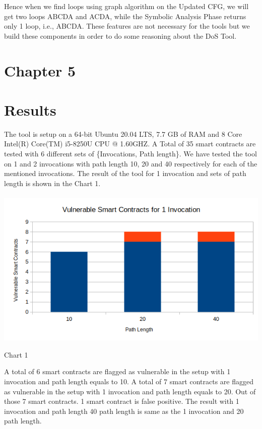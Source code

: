 \documentclass{article}
\begin{document}
Hence when we find loops using graph algorithm on the Updated CFG, we will get two loops ABCDA and ACDA, while the Symbolic Analysis Phase returns only 1 loop, i.e., ABCDA. These features are not necessary for the tools but we build these components in order to do some reasoning about the DoS Tool.

\newpage
\section*{Chapter 5}
\section*{Results}
The tool is setup on a 64-bit Ubuntu 20.04 LTS, 7.7 GB of RAM and 8 Core Intel(R) Core(TM) i5-8250U CPU @ 1.60GHZ. A Total of 35 smart contracts are tested with 6 different sets of \{Invocations, Path length\}. We have tested the tool on 1 and 2 invocations with path length 10, 20 and 40 respectively for each of the mentioned invocations.
The result of the tool for 1 invocation and sets of path length is shown in the Chart 1.\\
\\
\includegraphics[width= 15cm]{images/51.png}
\begin{center}
    Chart 1
\end{center}
A total of 6 smart contracts are flagged as vulnerable in the setup with 1 invocation and path length equals to 10. A total of 7 smart contracts are flagged as vulnerable in the setup with 1 invocation and path length equals to 20. Out of those 7 smart contracts. 1 smart contract is false positive. The result with 1 invocation and path length 40 path length is same as the 1 invocation and 20 path length.\\
\\
\end{document}
